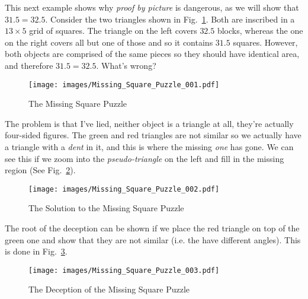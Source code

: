         \begin{example}
            This next example shows why \textit{proof by picture}%
             is dangerous, as we will show that
            $31.5=32.5$. Consider the two triangles shown in
            Fig.~\ref{fig:Missing_Square_Puzzle}. Both are inscribed in a
            $13\times{5}$ grid of squares. The triangle on the left covers
            $32.5$ blocks, whereas the one on the right covers all but one of
            those and so it contains $31.5$ squares. However, both objects are
            comprised of the same pieces so they should have identical area, and
            therefore $31.5=32.5$. What's wrong?
            \begin{figure}[H]
                \centering
                \captionsetup{type=figure}
                \texttt{[image: images/Missing\_Square\_Puzzle\_001.pdf]}
                \caption{The Missing Square Puzzle}
                \label{fig:Missing_Square_Puzzle}
            \end{figure}
            The problem is that I've lied, neither object is a triangle at all,
            they're actually four-sided figures. The green and red triangles are
            not similar so we actually have a triangle with a \textit{dent} in
            it, and this is where the missing \textit{one} has gone. We can see
            this if we zoom into the \textit{pseudo-triangle} on the left and
            fill in the missing region
            (See Fig.~\ref{fig:Missing_Square_Puzzle_Solution}).
            \begin{figure}[H]
                \centering
                \captionsetup{type=figure}
                \texttt{[image: images/Missing\_Square\_Puzzle\_002.pdf]}
                \caption{The Solution to the Missing Square Puzzle}
                \label{fig:Missing_Square_Puzzle_Solution}
            \end{figure}
            The root of the deception can be shown if we place the red triangle
            on top of the green one and show that they are not similar (i.e.
            the have different angles). This is done in
            Fig.~\ref{fig:Missing_Square_Puzzle_Deception}.
        \end{example}
        \begin{figure}[H]
            \centering
            \captionsetup{type=figure}
            \texttt{[image: images/Missing\_Square\_Puzzle\_003.pdf]}
            \caption{The Deception of the Missing Square Puzzle}
            \label{fig:Missing_Square_Puzzle_Deception}
        \end{figure}

